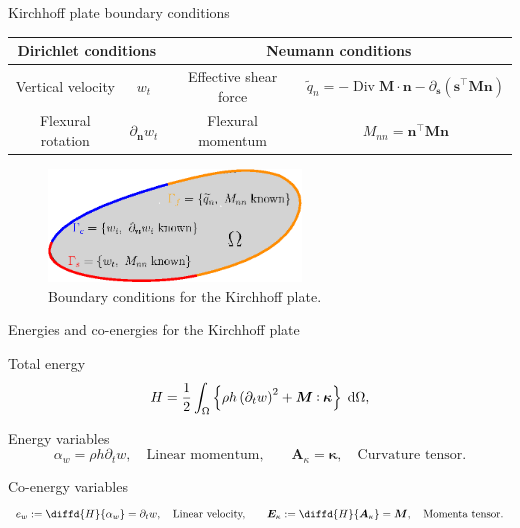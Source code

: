 \documentclass[aspectratio=169]{ISAE-Beamer}
\DeclareMathOperator*{\Div}{Div}
\def\onedot{$\mathsurround0pt\ldotp$}
\def\cddot{%
	\mathbin{\vcenter{\baselineskip.67ex
			\hbox{\onedot}\hbox{\onedot}}%
}}
\begin{document}
\begin{frame}{Kirchhoff plate boundary conditions}

\begin{table}
	\centering
	\begin{tabular}{cc|cc}
		\hline 
		\multicolumn{2}{c}{Dirichlet conditions}&  \multicolumn{2}{c}{Neumann conditions} \\ 
		\hline 
		Vertical velocity  & $w_t$ & Effective shear force  & $\widetilde{q}_n = -\Div \bm{M} \cdot \bm{n} - \partial_{\bm{s}} (\bm{s}^\top \bm{M} \bm{n})$ \\ 
		Flexural rotation  & $\partial_{\bm{n}} w_t $  & Flexural momentum & $M_{nn} = \bm{n}^\top\bm{M}\bm{n}$ \\  
		\hline 
	\end{tabular}
\end{table}

\begin{figure}[tb]
	\centering
	\includegraphics[width=0.6\textwidth]{part_2/kirchh_plate_bcs.eps}
	\caption{Boundary conditions for the Kirchhoff plate.}
\end{figure}
		
\end{frame}

\begin{frame}{Energies and co-energies for the Kirchhoff plate}
\begin{overlayarea}{\textwidth}{\textheight}
\begin{block}{Total energy}
	\setlength{\abovedisplayskip}{1pt}
	\setlength{\belowdisplayskip}{1pt}
	\begin{equation*}
	H = \frac{1}{2} \int_{\Omega}  \left\{ \rho h \left(\partial_t {w} \right)^2 + \bm{M} \cddot \bm{\kappa}\right\}  \d\Omega, 
	\end{equation*}
\end{block}
	
\begin{block}{Energy variables}
	\begin{equation*}
	\alpha_w = \rho h \partial_t {w}, \quad \text{Linear momentum,} \qquad
	\bm{A}_{\kappa} = \bm{\kappa}, \quad \text{Curvature tensor.} 
	\end{equation*}
\end{block}	

\begin{block}{Co-energy variables}
	\begin{equation*}
	e_w := \diffd{H}{\alpha_w} = \partial_t {w},  \quad \text{Linear velocity,} \qquad
	\bm{E}_{\kappa} := \diffd{H}{\bm{A}_{\kappa}} = \bm{M}, \quad \text{Momenta tensor.}
	\end{equation*}
\end{block}	
	
\end{overlayarea}	
\end{frame}
\end{document}
